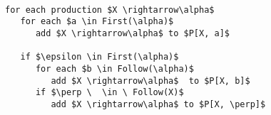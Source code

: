 \documentclass[
    border=0.2cm,
    convert={density=600}
]{standalone}
\begin{document}
\begin{lstlisting}[mathescape,backgroundcolor=\color{lightgray},basicstyle=\scriptsize\ttfamily]

for each production $X \rightarrow\alpha$
   for each $a \in First(\alpha)$
      add $X \rightarrow\alpha$ to $P[X, a]$
   
   if $\epsilon \in First(\alpha)$
      for each $b \in Follow(\alpha)$
         add $X \rightarrow\alpha$  to $P[X, b]$
      if $\perp \  \in \ Follow(X)$
         add $X \rightarrow\alpha$ to $P[X, \perp]$            
            
\end{lstlisting}
\end{document}

